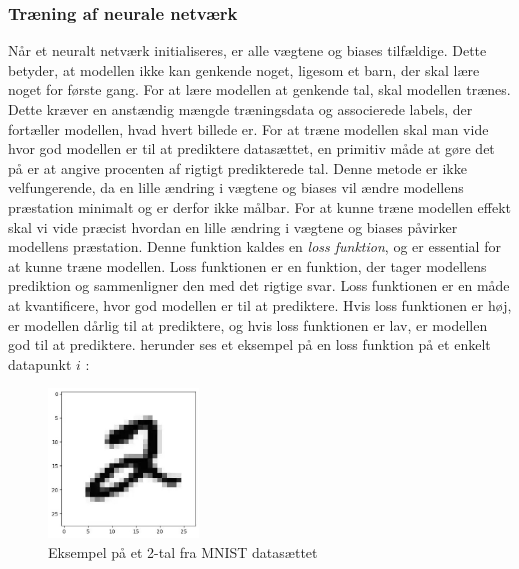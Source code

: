 \documentclass{article}
\begin{document}
\subsubsection{Træning af neurale netværk}
Når et neuralt netværk initialiseres, er alle vægtene og biases tilfældige. \parencite{Sanderson_2017} Dette betyder, at modellen ikke kan genkende noget, ligesom et barn, der skal lære noget for første gang. For at lære modellen at genkende tal, skal modellen trænes. Dette kræver en anstændig mængde træningsdata og associerede labels, der fortæller modellen, hvad hvert billede er. For at træne modellen skal man vide hvor god modellen er til at prediktere datasættet, en primitiv måde at gøre det på er at angive procenten af rigtigt predikterede tal. Denne metode er ikke velfungerende, da en lille ændring i vægtene og biases vil ændre modellens præstation minimalt og er derfor ikke målbar. For at kunne træne modellen effekt skal vi vide præcist hvordan en lille ændring i vægtene og biases påvirker modellens præstation. Denne funktion kaldes en \textit{loss funktion}, og er essential for at kunne træne modellen. Loss funktionen er en funktion, der tager modellens prediktion og sammenligner den med det rigtige svar. Loss funktionen er en måde at kvantificere, hvor god modellen er til at prediktere. Hvis loss funktionen er høj, er modellen dårlig til at prediktere, og hvis loss funktionen er lav, er modellen god til at prediktere. herunder ses et eksempel på en loss funktion på et enkelt datapunkt $i$ \parencite{Sanderson_2017}:
\begin{figure}
  \includegraphics[width=4cm]{mnist2.jpg}
  \vspace{-0.8cm}
  \caption{Eksempel på et 2-tal fra MNIST datasættet \parencite{LeCun_1994}}
  \label{fig:mnist2}
\end{figure}
\end{document}
